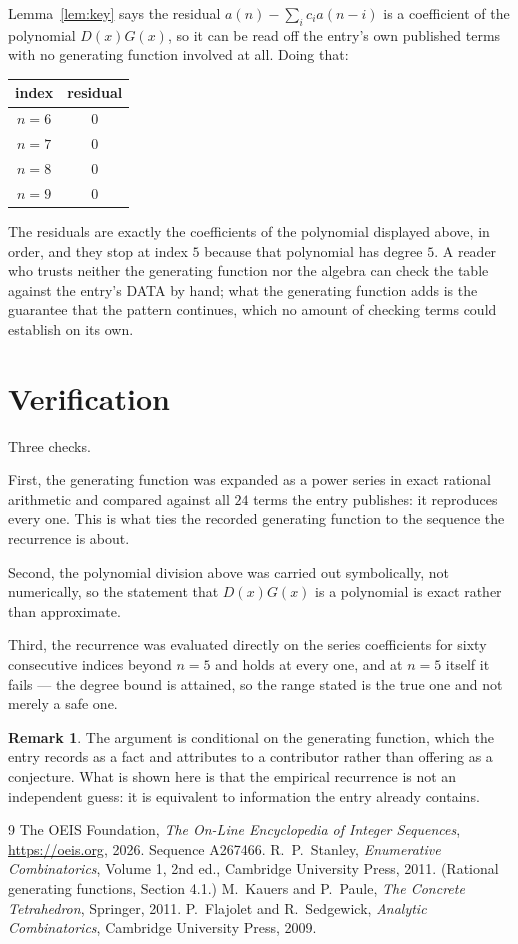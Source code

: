 \documentclass[11pt,a4paper]{article}
\theoremstyle{plain}
\theoremstyle{definition}
\newtheorem{remark}[theorem]{Remark}
\begin{document}
Lemma~\ref{lem:key} says the residual $a(n)-\sum_ic_ia(n-i)$ is a coefficient of the
polynomial $D(x)G(x)$, so it can be read off the entry's own published terms with no
generating function involved at all. Doing that:
\begin{center}
\begin{tabular}{cc}
index & residual \\ \hline
$n=6$ & $0$ \\
$n=7$ & $0$ \\
$n=8$ & $0$ \\
$n=9$ & $0$
\end{tabular}
\end{center}
The residuals are exactly the coefficients of the polynomial displayed above, in order, and
they stop at index $5$ because that polynomial has degree $5$. A reader who trusts
neither the generating function nor the algebra can check the table against the entry's DATA
by hand; what the generating function adds is the guarantee that the pattern continues, which
no amount of checking terms could establish on its own.

\section{Verification}

Three checks.

First, the generating function was expanded as a power series in exact rational arithmetic and
compared against all $24$ terms the entry publishes: it reproduces every one. This is
what ties the recorded generating function to the sequence the recurrence is about.

Second, the polynomial division above was carried out symbolically, not numerically, so the
statement that $D(x)G(x)$ is a polynomial is exact rather than approximate.

Third, the recurrence was evaluated directly on the series coefficients for sixty consecutive
indices beyond $n=5$ and holds at every one, and at $n=5$ itself it fails --- the
degree bound is attained, so the range stated is the true one and not merely a safe one.

\begin{remark}
The argument is conditional on the generating function, which the entry records as a fact and
attributes to a contributor rather than offering as a conjecture. What is shown here is that
the empirical recurrence is not an independent guess: it is equivalent to information the
entry already contains.
\end{remark}

\begin{thebibliography}{9}
 The OEIS Foundation, \emph{The On-Line Encyclopedia of Integer
Sequences}, \url{https://oeis.org}, 2026. Sequence A267466.
 R.~P.~Stanley, \emph{Enumerative Combinatorics}, Volume 1, 2nd ed.,
Cambridge University Press, 2011. (Rational generating functions, Section 4.1.)
 M.~Kauers and P.~Paule, \emph{The Concrete Tetrahedron}, Springer, 2011.
 P.~Flajolet and R.~Sedgewick, \emph{Analytic Combinatorics}, Cambridge
University Press, 2009.
\end{thebibliography}
\end{document}
